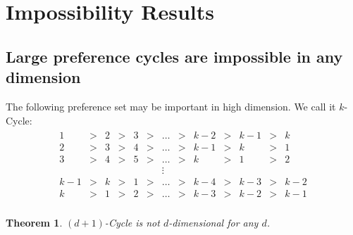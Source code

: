 \documentclass[12pt]{article}
\newtheorem{theorem}{Theorem}
\newcommand{\1}[1]{\mathds{1}[{#1}]}
\begin{document}
\section{Impossibility Results}

  \subsection{Large preference cycles are impossible in any dimension}
    The following preference set may be important in high dimension.
    We call it $k$-{\sc Cycle}:
    \begin{align*}
      \begin{array}{ccccccccccccccccccccccccccccccccccccccccc}
      1 &>& 2 &>& 3 &>&\ldots &>& k-2 &>& k-1 &>& k \\
      2 &>& 3 &>& 4 &>& \ldots &>& k-1 &>& k &>& 1 \\
      3 &>& 4 &>& 5 &>& \ldots &>& k &>& 1 &>& 2 \\
        &&    &&    &&   \vdots \\
      k-1&>&k&>& 1 &>&\ldots &>& k-4 &>& k-3 &>& k-2\\
      k &>& 1 &>& 2 &>& \ldots &>& k-3 &>& k-2 &>& k-1 \\
      \end{array}
    \end{align*}
    \begin{theorem}\label{thrm:noBigCycles}
      $(d+1)$-{\sc Cycle} is not $d$-dimensional for any $d$.
    \end{theorem}
\end{document}
